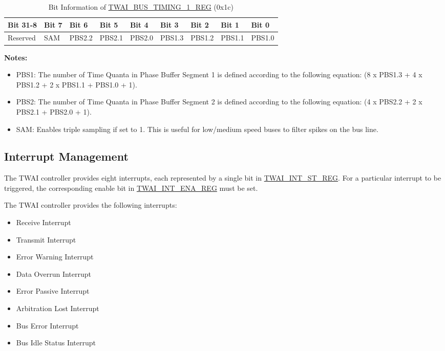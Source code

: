 \documentclass[main\_\_EN.tex]{subfiles}
\begin{document}
\begin{longtable}[c]{|p{1.4cm}|p{1.4cm}|p{1.4cm}|p{1.4cm}|p{1.4cm}|p{1.4cm}|p{1.4cm}|p{1.4cm}|p{1.4cm}|}
    \caption{Bit Information of \hyperref[regdesc:TWAIBUSTIMING1REG]{TWAI\_BUS\_TIMING\_1\_REG} (0x1c)}
    \label{tab:twai-bit-info-bus-timing-1-reg}\\
    \hline
       \rowcolor{lightgray}
   \textbf{Bit 31-8} & \textbf{Bit 7} & \textbf{Bit 6} & \textbf{Bit 5} & \textbf{Bit 4} & \textbf{Bit 3} & \textbf{Bit 2} & \textbf{Bit 1} & \textbf{Bit 0}\\\hline
   Reserved & SAM & PBS2.2 & PBS2.1 & PBS2.0 & PBS1.3 &PBS1.2 & PBS1.1 & PBS1.0\\
    \hline
\end{longtable}
\vspace{-1.5em}
{\bfseries Notes:}\\
\begin{itemize}
    \item PBS1: The number of Time Quanta in Phase Buffer Segment 1 is defined according to the following equation: (8 x PBS1.3 + 4 x PBS1.2 + 2 x PBS1.1 + PBS1.0 + 1).
    \item PBS2: The number of Time Quanta in Phase Buffer Segment 2 is defined according to the following equation: (4 x PBS2.2 + 2 x PBS2.1 + PBS2.0 + 1).
    \item SAM: Enables triple sampling if set to 1. This is useful for low/medium speed buses to filter spikes on the bus line.
\end{itemize}

\subsection{Interrupt Management}
\label{sec:twai-interrupt-management}
The \chipname{} TWAI controller provides eight interrupts, each represented by a single bit in \hyperref[regdesc:TWAIINTSTREG]{TWAI\_INT\_ST\_REG}. For a particular interrupt to be triggered, the corresponding enable bit in \hyperref[regdesc:TWAIINTENAREG]{TWAI\_INT\_ENA\_REG} must be set.

The TWAI controller provides the following interrupts:

\begin{itemize}
    \item Receive Interrupt
    \item Transmit Interrupt
    \item Error Warning Interrupt
    \item Data Overrun Interrupt
    \item Error Passive Interrupt
    \item Arbitration Lost Interrupt
    \item Bus Error Interrupt
    \item Bus Idle Status Interrupt
\end{itemize}
\end{document}
